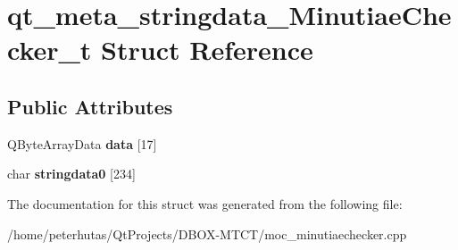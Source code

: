 \hypertarget{structqt__meta__stringdata___minutiae_checker__t}{}\section{qt\+\_\+meta\+\_\+stringdata\+\_\+\+Minutiae\+Checker\+\_\+t Struct Reference}
\label{structqt__meta__stringdata___minutiae_checker__t}
\subsection*{Public Attributes}
\begin{DoxyCompactItemize}
\item 
\mbox{\label{structqt__meta__stringdata___minutiae_checker__t_acae38086ab293652d5bb14eb219c9f8c}} 
Q\+Byte\+Array\+Data {\bfseries data} \mbox{[}17\mbox{]}
\item 
\mbox{\label{structqt__meta__stringdata___minutiae_checker__t_a8ac1a3a4d64f28c7074db71d3acdb149}} 
char {\bfseries stringdata0} \mbox{[}234\mbox{]}
\end{DoxyCompactItemize}


The documentation for this struct was generated from the following file\+:\begin{DoxyCompactItemize}
\item 
/home/peterhutas/\+Qt\+Projects/\+D\+B\+O\+X-\/\+M\+T\+C\+T/moc\+\_\+minutiaechecker.\+cpp\end{DoxyCompactItemize}
